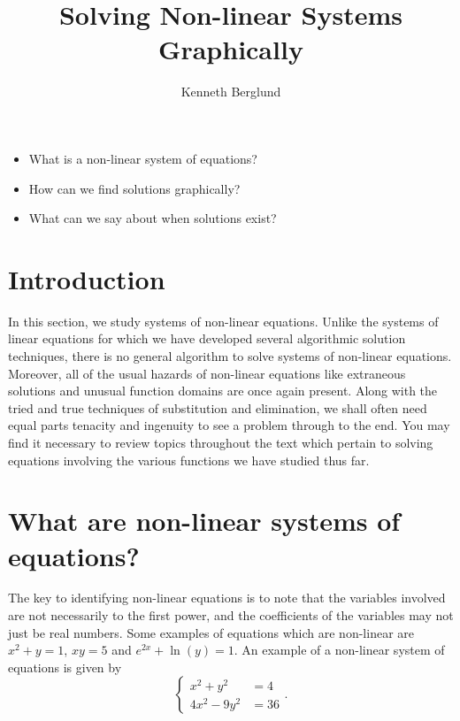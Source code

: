 \documentclass[nooutcomes]{ximera}
\author{Kenneth Berglund}
\title{Solving Non-linear Systems Graphically}
\begin{document}
\begin{abstract}
  
\end{abstract}
\maketitle

\begin{motivatingQuestions}\begin{itemize}
	\item What is a non-linear system of equations?
	\item How can we find solutions graphically?
	\item What can we say about when solutions exist?
\end{itemize}\end{motivatingQuestions}

\section{Introduction}
In this section, we study systems of non-linear equations. Unlike the systems of linear equations for which we have developed several algorithmic solution techniques, there is no general algorithm to solve systems of non-linear equations. Moreover, all of the usual hazards of non-linear equations like extraneous solutions and unusual function domains are once again present. Along with the tried and true techniques of substitution and elimination, we shall often need equal parts tenacity and ingenuity to see a problem through to the end. You may find it necessary to review topics throughout the text which pertain to solving equations involving the various functions we have studied thus far. 




\section{What are non-linear systems of equations?}

The key to identifying non-linear equations is to note that the variables involved are not necessarily to the first power, and the coefficients of the variables may not just be real numbers. Some examples of equations which are non-linear are $x^2+y = 1$, $xy = 5$ and $e^{2x} + \ln(y) = 1$. An example of a non-linear system of equations is given by 
$$
\begin{cases}
x^2 + y^2 & =  4 \\
4x^2 - 9y^2 & = 36
\end{cases}.
$$	
\end{document}
